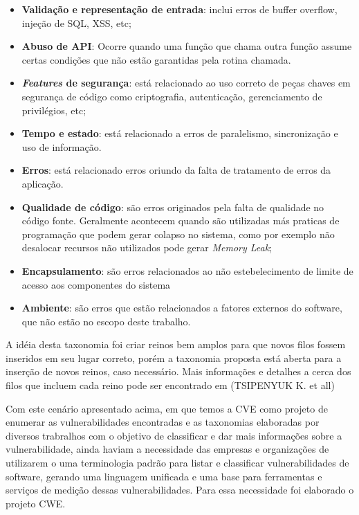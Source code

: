 \begin{itemize}
\item \textbf{Validação e representação de entrada}: inclui erros de buffer overflow, injeção de SQL, XSS, etc;
\item \textbf{Abuso de API}: Ocorre quando uma função que chama outra função assume certas condições que não estão garantidas pela rotina chamada.
\item \textbf{\emph{Features} de segurança}: está relacionado ao uso correto de peças chaves em segurança de código como criptografia, autenticação, gerenciamento de privilégios, etc;
\item \textbf{Tempo e estado}: está relacionado a erros de paralelismo, sincronização e uso de informação.
\item \textbf{Erros}: está relacionado erros oriundo da falta de tratamento de erros da aplicação.
\item \textbf{Qualidade de código}: são erros originados pela falta de qualidade no código fonte. Geralmente acontecem quando são utilizadas más praticas de programação que podem gerar colapso no sistema, como por exemplo não desalocar recursos não utilizados pode gerar \emph{Memory Leak};
\item \textbf{Encapsulamento}: são erros relacionados ao não estebelecimento de limite de acesso aos componentes do sistema
\item \textbf{Ambiente}: são erros que estão relacionados a fatores externos do software, que não estão no escopo deste trabalho.

\end{itemize}

A idéia desta taxonomia foi criar reinos bem amplos para que novos filos fossem inseridos em seu lugar correto, porém a taxonomia proposta está aberta para a inserção de novos reinos, caso necessário. Mais informações e detalhes a cerca dos filos que incluem cada reino pode ser encontrado em (TSIPENYUK K. et all)

%
Com este cenário apresentado acima, em que temos a CVE como projeto de enumerar as vulnerabilidades encontradas e as taxonomias elaboradas por diversos trabralhos com o objetivo de classificar e dar mais informações sobre a vulnerabilidade, ainda haviam a necessidade das empresas e organizações de utilizarem o uma terminologia padrão para listar e classificar vulnerabilidades de software, gerando uma linguagem unificada e uma base para ferramentas e serviços de medição dessas vulnerabilidades. Para essa necessidade foi elaborado o projeto CWE.

